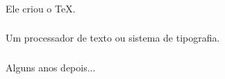 \documentclass{beamer}
\begin{document}
{%

  \begin{frame}
  \end{frame}
}

\begin{frame}\frametitle{}
  \begin{center}
    \Huge Ele criou o \TeX.
  \end{center}
\end{frame}

\begin{frame}\frametitle{}
  \begin{center}
    \Huge Um processador de texto ou sistema de tipografia.
  \end{center}
\end{frame}

\begin{frame}\frametitle{}
  \begin{center}
    \Huge Alguns anos depois...
  \end{center}
\end{frame}
\end{document}
